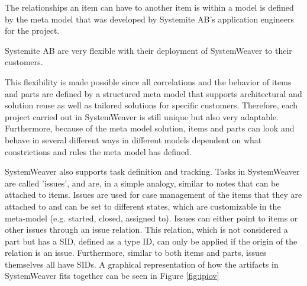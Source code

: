 \documentclass[conference]{IEEEtran}
\begin{document}
The relationships an item can have to another item is within a model is defined by the meta model that was developed by Systemite AB's application engineers for the project.

%
Systemite AB are very flexible with their deployment of SystemWeaver to their customers. 

This flexibility is made possible since all correlations and the behavior of items and parts are defined by a structured meta model that supports architectural and solution reuse as well as tailored solutions for specific customers.
Therefore, each project carried out in SystemWeaver is still unique but also very adaptable. 
Furthermore, because of the meta model solution, items and parts can look and behave in several different ways in different models dependent on what constrictions and rules the meta model has defined.



SystemWeaver also supports task definition and tracking.
Tasks in SystemWeaver are called 'issues', and are, in a simple analogy, similar to notes that can be attached to items. 
Issues are used for case management of the items that they are attached to and can be set to different states, which are customizable in the meta-model (e.g. started, closed, assigned to). 
Issues can either point to items or other issues through an issue relation.
This relation, which is not considered a part but has a SID, defined as a type ID, can only be applied if the origin of the relation is an issue.
Furthermore, similar to both items and parts, issues themselves all have SIDs. A graphical representation of how the artifacts in SystemWeaver fits together can be seen in Figure \ref{fig:ipiov}
\end{document}
